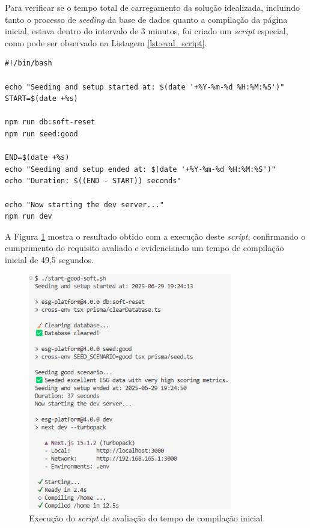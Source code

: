 Para verificar se o tempo total de carregamento da solução idealizada, incluindo tanto o processo de \textit{seeding} da base de dados quanto a compilação da página inicial, estava dentro do intervalo de 3 minutos, foi criado um \textit{script} especial, como pode ser observado na Listagem \ref{lst:eval_script}.

\begin{lstlisting}[style=customts, caption={\textit{Script} de avaliação de performance da iniciação da aplicação desenvolvida}, label={lst:eval_script}]
#!/bin/bash

echo "Seeding and setup started at: $(date '+%Y-%m-%d %H:%M:%S')"
START=$(date +%s)

npm run db:soft-reset
npm run seed:good

END=$(date +%s)
echo "Seeding and setup ended at: $(date '+%Y-%m-%d %H:%M:%S')"
echo "Duration: $((END - START)) seconds"

echo "Now starting the dev server..."
npm run dev
\end{lstlisting}

A Figura \ref{fig:initial_compile} mostra o resultado obtido com a execução deste \textit{script}, confirmando o cumprimento do requisito avaliado e evidenciando um tempo de compilação inicial de 49,5 segundos.

\begin{figure}[H]
    \centering
    \includegraphics[width=3.5in,keepaspectratio]{frontmatter/assets/compiling/initial_compile.png}
    \caption{Execução do \textit{script} de avaliação do tempo de compilação inicial}
    \label{fig:initial_compile}
\end{figure}

